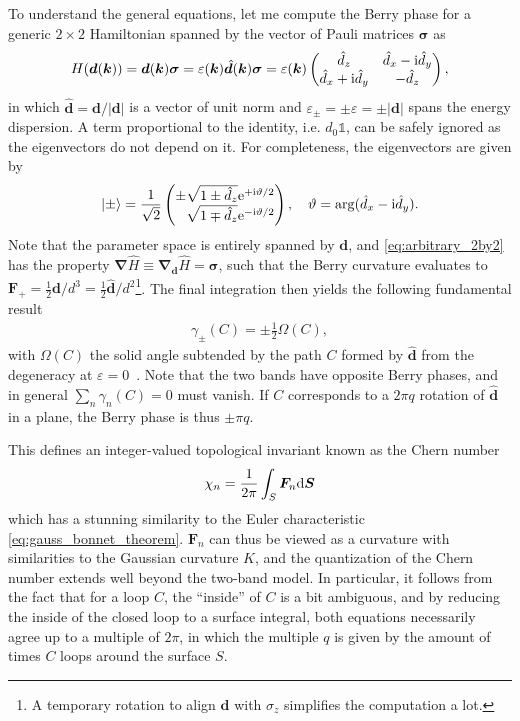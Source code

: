 To understand the general equations, let me compute the Berry phase for a generic $2\times 2$ Hamiltonian spanned by the vector of Pauli matrices $\bm\sigma$ as
\begin{align}
    H(\bm d(\bm k)) = \bm d(\bm k) \bm\sigma = \varepsilon(\bm k) \hat{\bm d}(\bm k)\bm\sigma
    =
    \varepsilon(\bm k)
    \begin{pmatrix}
        \hat d_z & \hat d_x - \mathrm i \hat d_y \\
        \hat d_x + \mathrm i \hat d_y & -\hat d_z
    \end{pmatrix},
    \label{eq:arbitrary_2by2}
\end{align}
in which $\hat{\bm d}={\bm d}/|\bm d|$ is a vector of unit norm and $\varepsilon_\pm = \pm\varepsilon = \pm|\bm d|$ spans the energy dispersion.
A term proportional to the identity, i.e. $d_0\mathbb 1$, can be safely ignored as the eigenvectors do not depend on it.
For completeness, the eigenvectors are given by
\begin{align}
    \ket{\pm} = \frac{1}{\sqrt{2}}
    \begin{pmatrix}
        \pm \sqrt{1 \pm \hat d_z}\re^{+\ri\vartheta/2}\\
        \phantom\pm\sqrt{1 \mp \hat d_z}\re^{-\ri\vartheta/2}
    \end{pmatrix}
    ,
    \quad
    \vartheta = \arg(\hat d_x-\ri \hat d_y).
\end{align}
Note that the parameter space is entirely spanned by $\bm d$, and \cref{eq:arbitrary_2by2} has the property $\bm\nabla\hat H \equiv \bm\nabla_{\bm d}\hat H = \bm\sigma$, such that the Berry curvature evaluates to ${\bm F}_+ = \frac12\bm d/d^3=\frac12\hat{\bm d}/d^2$\footnote{A temporary rotation to align $\bm d$ with $\sigma_z$ simplifies the computation a lot.}.
The final integration then yields the following fundamental result
\begin{align}
    \gamma_{\pm}(C) = \pm\frac12\Omega(C),
\end{align}
with $\Omega(C)$ the solid angle subtended by the path $C$ formed by $\hat {\bm d}$ from the degeneracy at $\varepsilon=0$~\cite{Berry1984}.
Note that the two bands have opposite Berry phases, and in general $\sum_n\gamma_n(C)=0$ must vanish.
If $C$ corresponds to a $2\pi q$ rotation of $\hat{\bm d}$ in a plane, the Berry phase is thus $\pm\pi q$.

This defines an integer-valued topological invariant known as the Chern number~\cite{Nakahara1990}
\begin{align}
    \chi_n = \frac1{2\pi}\int_S {\bm F_n} \mathrm d{\bm S}
\end{align}
which has a stunning similarity to the Euler characteristic \cref{eq:gauss_bonnet_theorem}.
$\bm F_n$ can thus be viewed as a curvature with similarities to the Gaussian curvature $K$, and the quantization of the Chern number extends well beyond the two-band model.
In particular, it follows from the fact that for a loop $C$, the ``inside'' of $C$ is a bit ambiguous, and by reducing the inside of the closed loop to a surface integral, both equations necessarily agree up to a multiple of $2\pi$, in which the multiple $q$ is given by the amount of times $C$ loops around the surface $S$.

